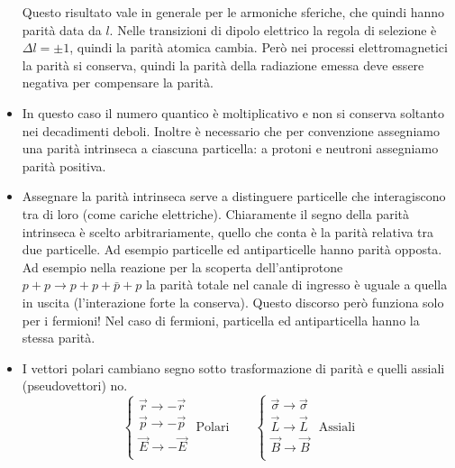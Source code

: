 \begin{itemize}
\begin{equation*}
    \end{equation*}
    Questo risultato vale in generale per le armoniche sferiche, che quindi hanno parità data da $l$. Nelle transizioni di dipolo elettrico la regola di selezione è $\Delta l=\pm 1$, quindi la parità atomica cambia. Però nei processi elettromagnetici la parità si conserva, quindi la parità della radiazione emessa deve essere negativa per compensare la parità. 
    \item In questo caso il numero quantico è moltiplicativo e non si conserva soltanto nei decadimenti deboli. Inoltre è necessario che per convenzione assegniamo una parità intrinseca a ciascuna particella: a protoni e neutroni assegniamo parità positiva.
    \item Assegnare la parità intrinseca serve a distinguere particelle che interagiscono tra di loro (come cariche elettriche). Chiaramente il segno della parità intrinseca è scelto arbitrariamente, quello che conta è la parità relativa tra due particelle. Ad esempio particelle ed antiparticelle hanno parità opposta. Ad esempio nella reazione per la scoperta dell'antiprotone $p+p\to p+p+\bar p+p$ la parità totale nel canale di ingresso è uguale a quella in uscita (l'interazione forte la conserva). Questo discorso però funziona solo per i fermioni! Nel caso di fermioni, particella ed antiparticella hanno la stessa parità. 
    \item I vettori polari cambiano segno sotto trasformazione di parità e quelli assiali (pseudovettori) no.
    \begin{equation*}
    \begin{cases}
    \vec r\to-\vec r\\
    \vec p\to-\vec p\\
    \vec E\to-\vec E\\
    \end{cases}\text{ Polari}\qquad
    \begin{cases}
        \vec \sigma\to\vec \sigma\\
        \vec L\to\vec L\\
        \vec B\to\vec B\\
    \end{cases}\text{ Assiali}
    \end{equation*}
\end{itemize}
